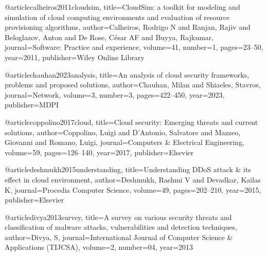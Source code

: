 @article{calheiros2011cloudsim,
  title={CloudSim: a toolkit for modeling and simulation of cloud computing environments and evaluation of resource provisioning algorithms},
  author={Calheiros, Rodrigo N and Ranjan, Rajiv and Beloglazov, Anton and De Rose, C{\'e}sar AF and Buyya, Rajkumar},
  journal={Software: Practice and experience},
  volume={41},
  number={1},
  pages={23--50},
  year={2011},
  publisher={Wiley Online Library}
}













@article{chauhan2023analysis,
  title={An analysis of cloud security frameworks, problems and proposed solutions},
  author={Chauhan, Milan and Shiaeles, Stavros},
  journal={Network},
  volume={3},
  number={3},
  pages={422--450},
  year={2023},
  publisher={MDPI}
}












@article{coppolino2017cloud,
  title={Cloud security: Emerging threats and current solutions},
  author={Coppolino, Luigi and D’Antonio, Salvatore and Mazzeo, Giovanni and Romano, Luigi},
  journal={Computers \& Electrical Engineering},
  volume={59},
  pages={126--140},
  year={2017},
  publisher={Elsevier}
}










@article{deshmukh2015understanding,
  title={Understanding DDoS attack \& its effect in cloud environment},
  author={Deshmukh, Rashmi V and Devadkar, Kailas K},
  journal={Procedia Computer Science},
  volume={49},
  pages={202--210},
  year={2015},
  publisher={Elsevier}
}












@article{divya2013survey,
  title={A survey on various security threats and classification of malware attacks, vulnerabilities and detection techniques},
  author={Divya, S},
  journal={International Journal of Computer Science \& Applications (TIJCSA)},
  volume={2},
  number={04},
  year={2013}
}










